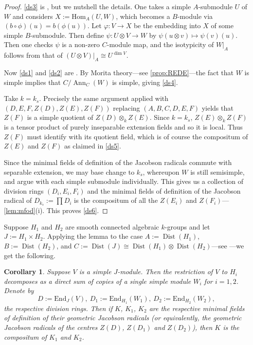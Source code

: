 \documentclass[11pt,reqno]{amsart}
\newtheorem{cor}[lemma]{Corollary}
\theoremstyle{definition}
\theoremstyle{remark}
\theoremstyle{definition}
\theoremstyle{plain}
\DeclareMathOperator{\Dist}{Dist}
\DeclareMathOperator{\Ann}{Ann}
\newcommand{\Hom}{\mathrm{Hom}}
\newcommand{\End}{\mathrm{End}}
\begin{document}
\begin{proof} 
 \cref{ds3} is \cite[VIII, ~\S12.1, Prop.~2]{BourbAlg8}, but we nutshell the details. One takes a simple $A$-submodule $U$ of $W$ and considers $X:=\Hom_A(U,W)$, which becomes a $B$-module via $(b\circ\phi)(u)=b(\phi(u))$. Let $\varphi:V\to X$ be the embedding into $X$ of some simple $B$-submodule. Then define $\psi:U\otimes V\to W$ by $\psi(u\otimes v)\mapsto \psi(v)(u)$. Then one checks $\psi$ is a non-zero $C$-module map, and the isotypicity of $W|_{A}$ follows from that of $(U\otimes V)|_A\cong U^{\dim V}$.
 
Now \cref{ds1} and \cref{ds2} are \cite[VIII, \S12.5, Prop.~5(a)] {BourbAlg8}. By Morita theory---see \cref{prop:REDE}---the fact that $W$ is simple implies that $C/\Ann_C(W)$ is simple, giving \cref{ds4}. 

Take $k=k_s$. Precisely the same argument applied with $(D,E,F,Z(D),Z(E),Z(F))$ replacing $(A,B,C,D,E,F)$ yields that $Z(F)$ is a simple quotient of $Z(D)\otimes_k Z(E)$. Since $k=k_s$, $Z(E)\otimes_k Z(F)$ is a tensor product of purely inseparable extension fields and so it is local.
Thus $Z(F)$ must identify with its quotient field, which is of course the compositum of $Z(E)$ and $Z(F)$ as claimed in \cref{ds5}.

Since the minimal fields of definition of the Jacobson radicals commute with separable extension, we may base change to $k_s$, whereupon $W$ is still semisimple, and argue with each simple submodule individually. This gives us a collection of division rings $(D_i,E_i,F_i)$ and the minimal fields of definition of the Jacobson radical of $D_{k_s}:=\prod D_i$ is the compositum of all the $Z(E_i)$ and $Z(F_i)$---\cref{lem:mfod}(i). This proves \cref{ds6}.
\end{proof}

Suppose $H_1$ and $H_2$ are smooth connected algebraic $k$-groups and let $J:=H_1\times H_2$. Applying the lemma to the case $A:=\Dist(H_1)$, $B:=\Dist(H_2)$, and $C:=\Dist(J)\cong\Dist(H_1)\otimes\Dist(H_2)$---see \cite[I.7.9(3)]{Jan03}---we get the following.

\begin{cor}\label{redtofactors}
  Suppose $V$ is a simple $J$-module. 
Then the restriction of $V$ to $H_i$ decomposes as a direct sum of copies of a single simple module $W_i$ for $i=1,2$.
Denote by 
$$D:=\End_{J}(V),\ D_1:=\End_{H_1}(W_1),\ D_2:=\End_{H_2}(W_2),$$ the respective division rings. 
Then if $K$, $K_1$, $K_2$ are the respective minimal fields of definition of their geometric Jacobson radicals (or equivalently, the geometric Jacobson radicals of the centres $Z(D)$, $Z(D_1)$ and $Z(D_2)$), then $K$ is the compositum of $K_1$ and $K_2$.
\end{cor}
\end{document}
